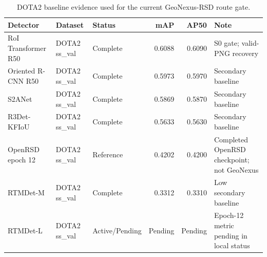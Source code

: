 \begin{table}[t]
\centering
\caption{DOTA2 baseline evidence used for the current GeoNexus-RSD route gate.}
\label{tab:dota2\_baselines}
\begin{tabular}{lllrrl}
\toprule
Detector & Dataset & Status & mAP & AP50 & Note \\
\midrule
RoI Transformer R50 & DOTA2 ss\_val & Complete & 0.6088 & 0.6090 & S0 gate; valid-PNG recovery \\
Oriented R-CNN R50 & DOTA2 ss\_val & Complete & 0.5973 & 0.5970 & Secondary baseline \\
S2ANet & DOTA2 ss\_val & Complete & 0.5869 & 0.5870 & Secondary baseline \\
R3Det-KFIoU & DOTA2 ss\_val & Complete & 0.5633 & 0.5630 & Secondary baseline \\
OpenRSD epoch 12 & DOTA2 ss\_val & Reference & 0.4202 & 0.4200 & Completed OpenRSD checkpoint; not GeoNexus \\
RTMDet-M & DOTA2 ss\_val & Complete & 0.3312 & 0.3310 & Low secondary baseline \\
RTMDet-L & DOTA2 ss\_val & Active/Pending & Pending & Pending & Epoch-12 metric pending in local status \\
\bottomrule
\end{tabular}
\end{table}
